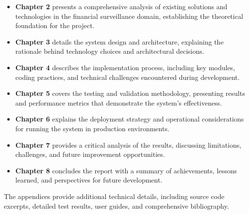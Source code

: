 \begin{itemize}
    \item \textbf{Chapter 2} presents a comprehensive analysis of existing solutions and technologies in the financial surveillance domain, establishing the theoretical foundation for the project.
    
    \item \textbf{Chapter 3} details the system design and architecture, explaining the rationale behind technology choices and architectural decisions.
    
    \item \textbf{Chapter 4} describes the implementation process, including key modules, coding practices, and technical challenges encountered during development.
    
    \item \textbf{Chapter 5} covers the testing and validation methodology, presenting results and performance metrics that demonstrate the system's effectiveness.
    
    \item \textbf{Chapter 6} explains the deployment strategy and operational considerations for running the system in production environments.
    
    \item \textbf{Chapter 7} provides a critical analysis of the results, discussing limitations, challenges, and future improvement opportunities.
    
    \item \textbf{Chapter 8} concludes the report with a summary of achievements, lessons learned, and perspectives for future development.
\end{itemize}

The appendices provide additional technical details, including source code excerpts, detailed test results, user guides, and comprehensive bibliography.

